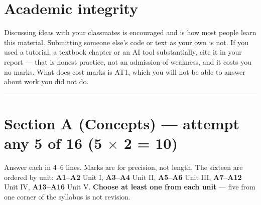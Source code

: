 \documentclass[11pt,a4paper]{article}
\begin{document}
\section*{Academic integrity}

Discussing ideas with your classmates is encouraged and is how most people
learn this material. Submitting someone else's code or text as your own is not.
If you used a tutorial, a textbook chapter or an AI tool substantially, cite it
in your report --- that is honest practice, not an admission of weakness, and
it costs you no marks. What does cost marks is AT1, which you will not be able
to answer about work you did not do.

\vspace{0.5em}\hrule\vspace{0.8em}

\section*{Section A (Concepts) --- attempt any 5 of 16 \quad (5 $\times$ 2 = 10)}

\noindent\small Answer each in 4--6 lines. Marks are for precision, not length.
The sixteen are ordered by unit: \textbf{A1--A2} Unit I, \textbf{A3--A4} Unit
II, \textbf{A5--A6} Unit III, \textbf{A7--A12} Unit IV,
\textbf{A13--A16} Unit V. \textbf{Choose at least
one from each unit} --- five from one corner of the syllabus is not
revision.\normalsize
\end{document}
